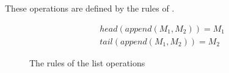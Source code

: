 These operations are defined by the rules of .

\begin{figure}[h]
	\begin{align*}
		&head(append(M_1, M_2)) = M_1 \tag{Head} \\
		&tail(append(M_1, M_2)) = M_2 \tag{Tail}
	\end{align*}
	\caption{The rules of the list operations}
	\label{listoprules}
\end{figure}

\FloatBarrier


